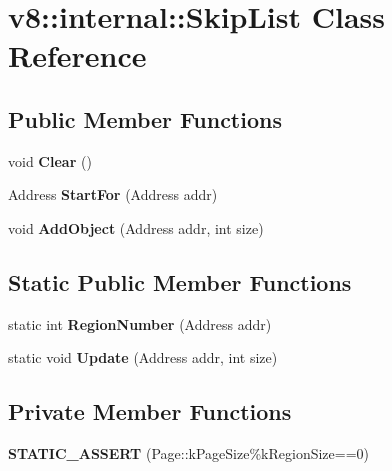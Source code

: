 \hypertarget{classv8_1_1internal_1_1_skip_list}{}\section{v8\+:\+:internal\+:\+:Skip\+List Class Reference}
\label{classv8_1_1internal_1_1_skip_list}
\subsection*{Public Member Functions}
\begin{DoxyCompactItemize}
\item 
void {\bfseries Clear} ()\hypertarget{classv8_1_1internal_1_1_skip_list_aa7f250b2de572f5e46c9de704f0bf9e0}{}\label{classv8_1_1internal_1_1_skip_list_aa7f250b2de572f5e46c9de704f0bf9e0}

\item 
Address {\bfseries Start\+For} (Address addr)\hypertarget{classv8_1_1internal_1_1_skip_list_a0387ed9e1fea8f3c470fca611259dfe5}{}\label{classv8_1_1internal_1_1_skip_list_a0387ed9e1fea8f3c470fca611259dfe5}

\item 
void {\bfseries Add\+Object} (Address addr, int size)\hypertarget{classv8_1_1internal_1_1_skip_list_a297e1c51c3d473727ae5748cf4b5536a}{}\label{classv8_1_1internal_1_1_skip_list_a297e1c51c3d473727ae5748cf4b5536a}

\end{DoxyCompactItemize}
\subsection*{Static Public Member Functions}
\begin{DoxyCompactItemize}
\item 
static int {\bfseries Region\+Number} (Address addr)\hypertarget{classv8_1_1internal_1_1_skip_list_aac6fce51cc7637ea622e4d47bff619fa}{}\label{classv8_1_1internal_1_1_skip_list_aac6fce51cc7637ea622e4d47bff619fa}

\item 
static void {\bfseries Update} (Address addr, int size)\hypertarget{classv8_1_1internal_1_1_skip_list_a3be6172846582899cd94eb989bbe0d06}{}\label{classv8_1_1internal_1_1_skip_list_a3be6172846582899cd94eb989bbe0d06}

\end{DoxyCompactItemize}
\subsection*{Private Member Functions}
\begin{DoxyCompactItemize}
\item 
{\bfseries S\+T\+A\+T\+I\+C\+\_\+\+A\+S\+S\+E\+RT} (Page\+::k\+Page\+Size\%k\+Region\+Size==0)\hypertarget{classv8_1_1internal_1_1_skip_list_a2e7ea89f9c7d1644504dc63b9e67ca6a}{}\label{classv8_1_1internal_1_1_skip_list_a2e7ea89f9c7d1644504dc63b9e67ca6a}

\end{DoxyCompactItemize}
